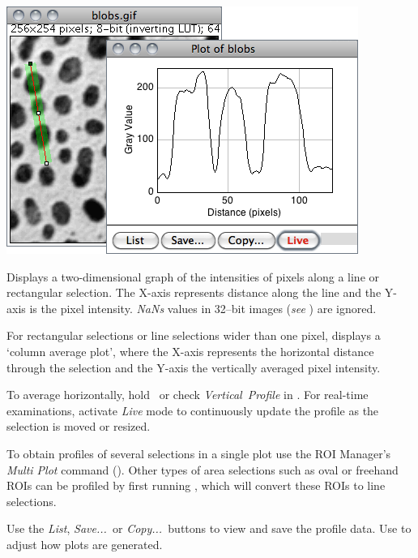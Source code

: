 \begin{minipage}[c][1\totalheight][t]{0.591\columnwidth}%
\includegraphics[scale=0.55]{images/PlotProfile}%
\end{minipage}%
\begin{minipage}[c][1\totalheight][t]{0.409\columnwidth}%
Displays a two-dimensional graph of the intensities
of pixels along a line or rectangular selection. The X-axis represents
distance along the line and the Y-axis is the pixel intensity. \emph{NaNs}
values in 32--bit images (\emph{see} ) are
ignored.

\medskip{}
For rectangular selections or line selections wider than one pixel,
displays a `column average plot', where the X-axis represents the
horizontal distance through the selection and the Y-axis the vertically
averaged pixel intensity.%
\end{minipage}

To average horizontally, hold \,
or check \emph{Vertical}\ \emph{Profile }in .
For real-time examinations, activate \emph{Live} mode to continuously
update the profile as the selection is moved or resized.

To obtain profiles of several selections in a single plot use the
ROI Manager's \emph{Multi Plot }command ().
Other types of area selections such as oval or freehand ROIs can be
profiled by first running ,
which will convert these ROIs to line selections.

Use the \emph{List},\emph{ Save...\ }or \emph{Copy...\ }buttons
to view and save the profile data. Use 
to adjust how plots are generated.


